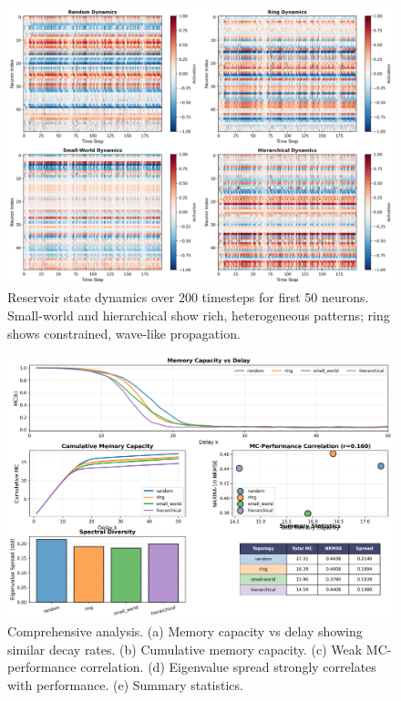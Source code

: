 \documentclass{article}
\begin{document}
\begin{figure}[t]
\centering
\includegraphics[width=\textwidth]{temporal_dynamics.png}
\caption{Reservoir state dynamics over 200 timesteps for first 50 neurons. Small-world and hierarchical show rich, heterogeneous patterns; ring shows constrained, wave-like propagation.}
\label{fig:dynamics}
\end{figure}

\begin{figure}[t]
\centering
\includegraphics[width=\textwidth]{comprehensive_analysis.png}
\caption{Comprehensive analysis. (a) Memory capacity vs delay showing similar decay rates. (b) Cumulative memory capacity. (c) Weak MC-performance correlation. (d) Eigenvalue spread strongly correlates with performance. (e) Summary statistics.}
\label{fig:comprehensive}
\end{figure}
\end{document}
